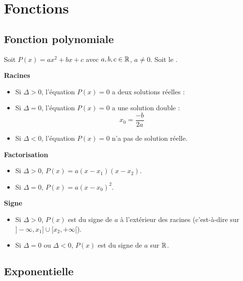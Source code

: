 \documentclass[10pt,class=article,crop=false]{standalone}
\begin{document}
\section{Fonctions}


\begin{multicols}{2}

\subsection{Fonction polynomiale}


Soit $P(x) = ax^2+bx+c$ avec $a,b,c \in \mathbb{R}$, $a\neq0$.
Soit  le .

\textbf{Racines}
\begin{itemize}
	\item Si $\Delta > 0$, l'équation $P(x)=0$ a deux solutions réelles :
		
	\item Si $\Delta = 0$, l'équation $P(x)=0$ a une solution double :
$$x_0 = \frac{-b}{2a}$$	

	\item Si $\Delta < 0$, l'équation $P(x)=0$ n'a pas de solution réelle.
\end{itemize}

\textbf{Factorisation}
\begin{itemize}
	\item Si $\Delta > 0$, $P(x)= a(x-x_1)(x-x_2)$.
	\item Si $\Delta = 0$, $P(x) = a(x-x_0)^2$.
\end{itemize}

\textbf{Signe}
\begin{itemize}
	\item Si $\Delta > 0$, $P(x)$ est du signe de $a$ à l'extérieur des racines
	(c'est-à-dire sur $]-\infty,x_1] \cup [x_2,+\infty[$). 
	
	\item Si $\Delta = 0$ ou $\Delta < 0$, $P(x)$ est du signe de $a$ sur $\mathbb{R}$.
\end{itemize}


\subsection{Exponentielle}


\end{multicols}
\end{document}
